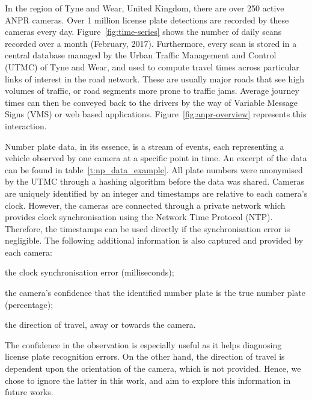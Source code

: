 In the region of Tyne and Wear, United Kingdom, there are over 250 active ANPR cameras. Over 1 million license plate detections are recorded by these cameras every day. Figure~\ref{fig:time-series} shows the number of daily scans recorded over a month (February, 2017). Furthermore, every scan is stored in a central database managed by the Urban Traffic Management and Control (UTMC) of Tyne and Wear, and used to compute travel times across particular links of interest in the road network. These are usually major roads that see high volumes of traffic, or road segments more prone to traffic jams. Average journey times can then be conveyed back to the drivers by the way of Variable Message Signs (VMS) or web based applications. Figure~\ref{fig:anpr-overview} represents this interaction.

Number plate data, in its essence, is a stream of events, each representing a vehicle observed by one camera at a specific point in time. An excerpt of the data can be found in table~\ref{t:np_data_example}. All plate numbers were anonymised by the UTMC through a hashing algorithm before the data was shared. Cameras are uniquely identified by an integer and timestamps are relative to each camera's clock. However, the cameras are connected through a private network which provides clock synchronisation using the Network Time Protocol (NTP). Therefore, the timestamps can be used directly if the synchronisation error is negligible. The following additional information is also captured and provided by each camera:
\begin{enumerate*}[label=(\roman*)]
  \item the clock synchronisation error (milliseconds);
  \item the camera's confidence that the identified number plate is the true number plate (percentage);
  \item the direction of travel, away or towards the camera.
\end{enumerate*}
The confidence in the observation is especially useful as it helps diagnosing license plate recognition errors. On the other hand, the direction of travel is dependent upon the orientation of the camera, which is not provided. Hence, we chose to ignore the latter in this work, and aim to explore this information in future works.

